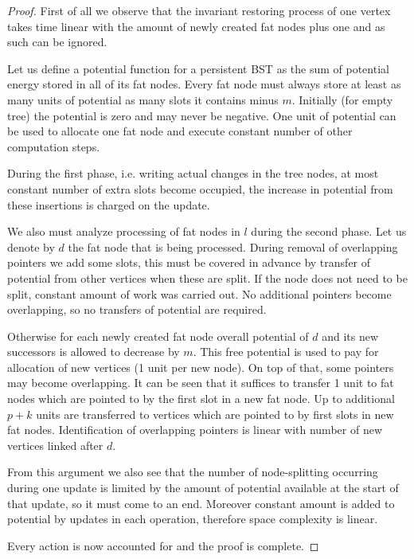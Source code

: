 \begin{proof}
First of all we observe that the invariant restoring process of one vertex takes time linear with the amount of newly created fat nodes plus one and as such can be ignored.
	
Let us define a potential function for a persistent BST as the sum of potential energy stored in all of its fat nodes. 
Every fat node must always store at least as many units of potential as many slots it contains minus $m$. 
Initially (for empty tree) the potential is zero and may never be negative. One unit of potential can be used to allocate one fat node and execute constant number of other computation steps.

During the first phase, i.e. writing actual changes in the tree nodes, at most constant number of extra slots become occupied, the increase in potential from these insertions is charged on the update.

We also must analyze processing of fat nodes in $l$ during the second phase. Let us denote by $d$ the fat node that is being processed. 
During removal of overlapping pointers we add some slots, this must be covered in advance by transfer of potential from other vertices when these are split. 
If the node does not need to be split, constant amount of work was carried out. 
No additional pointers become overlapping, so no transfers of potential are required.

Otherwise for each newly created fat node overall potential of $d$ and its new successors is allowed to decrease by $m$.
This free potential is used to pay for allocation of new vertices (1 unit per new node). 
On top of that, some pointers may become overlapping. It can be seen that it suffices to transfer 1 unit to fat nodes which are pointed to by the first slot in a new fat node. Up to additional $p+k$ units are transferred to vertices which are pointed to by first slots in new fat nodes.
Identification of overlapping pointers is linear with number of new vertices linked after $d$.

From this argument we also see that the number of node-splitting occurring during one update is limited by the amount of potential available at the start of that update, so it must come to an end. Moreover constant amount is added to potential by updates in each operation, therefore space complexity is linear.

Every action is now accounted for and the proof is complete.
\end{proof}


